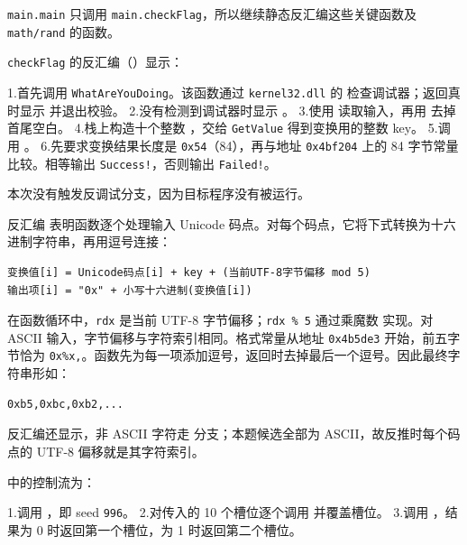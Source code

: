 \texttt{main.main} 只调用 \texttt{main.checkFlag}，所以继续静态反汇编这些关键函数及 \texttt{math/rand} 的函数。

\texttt{checkFlag} 的反汇编（\texttt{}）显示：

1.首先调用 \texttt{WhatAreYouDoing}。该函数通过 \texttt{kernel32.dll} 的 \texttt{} 检查调试器；返回真时显示 \texttt{} 并退出校验。 2.没有检测到调试器时显示 \texttt{}。 3.使用 \texttt{} 读取输入，再用 \texttt{} 去掉首尾空白。 4.栈上构造十个整数 \texttt{\seqsplit{{[}1,2,3,4,5,6,7,8,9,0{]}}}，交给 \texttt{GetValue} 得到变换用的整数 key。 5.调用 \texttt{}。 6.先要求变换结果长度是 \texttt{0x54}（84），再与地址 \texttt{0x4bf204} 上的 84 字节常量比较。相等输出 \texttt{Success!}，否则输出 \texttt{Failed!}。

本次没有触发反调试分支，因为目标程序没有被运行。

反汇编 \texttt{} 表明函数逐个处理输入 Unicode 码点。对每个码点，它将下式转换为十六进制字符串，再用逗号连接：

\begin{verbatim}
变换值[i] = Unicode码点[i] + key + (当前UTF-8字节偏移 mod 5)
输出项[i] = "0x" + 小写十六进制(变换值[i])
\end{verbatim}

在函数循环中，\texttt{rdx} 是当前 UTF-8 字节偏移；\texttt{rdx\ \%\ 5} 通过乘魔数 \texttt{} 实现。对 ASCII 输入，字节偏移与字符索引相同。格式常量从地址 \texttt{0x4b5de3} 开始，前五字节恰为 \texttt{0x\%x,}。函数先为每一项添加逗号，返回时去掉最后一个逗号。因此最终字符串形如：

\begin{verbatim}
0xb5,0xbc,0xb2,...
\end{verbatim}

反汇编还显示，非 ASCII 字符走 \texttt{} 分支；本题候选全部为 ASCII，故反推时每个码点的 UTF-8 偏移就是其字符索引。

\texttt{} 中的控制流为：

1.调用 \texttt{}，即 seed \texttt{996}。 2.对传入的 10 个槽位逐个调用 \texttt{} 并覆盖槽位。 3.调用 \texttt{}，结果为 0 时返回第一个槽位，为 1 时返回第二个槽位。

